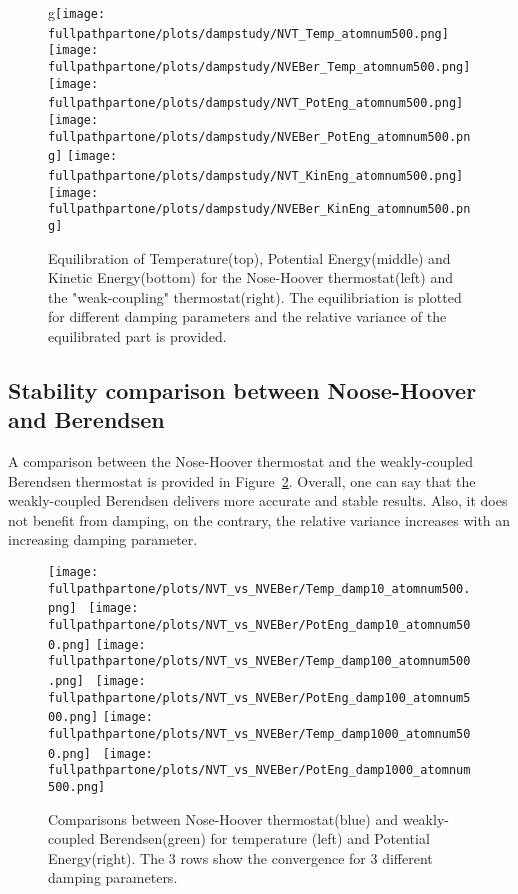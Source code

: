 \documentclass[10pt,a4paper]{report}
\def \fullpathpartone {/home/lukas/Desktop/project/independence/atomistic_modeling/exam/1_three-dimensional_atomic_system}
\begin{document}
\begin{center}
\begin{figure}[h]
g\texttt{[image: \\fullpathpartone/plots/dampstudy/NVT\_Temp\_atomnum500.png]}~
\texttt{[image: \\fullpathpartone/plots/dampstudy/NVEBer\_Temp\_atomnum500.png]}
\texttt{[image: \\fullpathpartone/plots/dampstudy/NVT\_PotEng\_atomnum500.png]}~
\texttt{[image: \\fullpathpartone/plots/dampstudy/NVEBer\_PotEng\_atomnum500.png]}
\texttt{[image: \\fullpathpartone/plots/dampstudy/NVT\_KinEng\_atomnum500.png]}~
\texttt{[image: \\fullpathpartone/plots/dampstudy/NVEBer\_KinEng\_atomnum500.png]}
\caption[aaa]{Equilibration of Temperature(top), Potential Energy(middle) and Kinetic Energy(bottom) for the Nose-Hoover thermostat(left) and the "weak-coupling" thermostat(right). The equilibriation is plotted for different damping parameters and the relative variance of the equilibrated part is provided.}
\label{fig:p1_equilibriation}
\end{figure}
\end{center}


\subsection{Stability comparison between Noose-Hoover and Berendsen}
A comparison between the Nose-Hoover thermostat and the weakly-coupled Berendsen thermostat is provided in Figure~\ref{fig:p1_NVT_vs_NVEBer}.
Overall, one can say that the weakly-coupled Berendsen delivers more accurate and stable results. Also, it does not benefit from damping, on the contrary, the relative variance increases with an increasing damping parameter.

\begin{center}
\begin{figure}[h]
\texttt{[image: \\fullpathpartone/plots/NVT\_vs\_NVEBer/Temp\_damp10\_atomnum500.png]}~
\texttt{[image: \\fullpathpartone/plots/NVT\_vs\_NVEBer/PotEng\_damp10\_atomnum500.png]}
\texttt{[image: \\fullpathpartone/plots/NVT\_vs\_NVEBer/Temp\_damp100\_atomnum500.png]}~
\texttt{[image: \\fullpathpartone/plots/NVT\_vs\_NVEBer/PotEng\_damp100\_atomnum500.png]}
\texttt{[image: \\fullpathpartone/plots/NVT\_vs\_NVEBer/Temp\_damp1000\_atomnum500.png]}~
\texttt{[image: \\fullpathpartone/plots/NVT\_vs\_NVEBer/PotEng\_damp1000\_atomnum500.png]}
\caption[aaa]{Comparisons between Nose-Hoover thermostat(blue) and weakly-coupled Berendsen(green) for temperature (left) and Potential Energy(right). The 3 rows show the convergence for 3 different damping parameters.}
\label{fig:p1_NVT_vs_NVEBer}
\end{figure}
\end{center}
\end{document}
